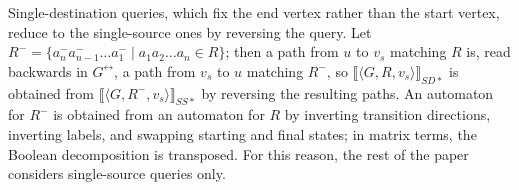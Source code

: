 %	
%	
%	

Single-destination queries, which fix the end vertex rather than the start vertex, reduce to the single-source ones by reversing the query.
Let $R^- = \{ a_n^- a_{n-1}^- \ldots a_1^- \mid a_1 a_2 \ldots a_n \in R \}$; then a path from $u$ to $v_s$ matching $R$ is, read backwards in $G^\leftrightarrow$, a path from $v_s$ to $u$ matching $R^-$, so $\llbracket \langle G, R, v_s \rangle \rrbracket_{SD*}$ is obtained from $\llbracket \langle G, R^-, v_s \rangle \rrbracket_{SS*}$ by reversing the resulting paths.
An automaton for $R^-$ is obtained from an automaton for $R$ by inverting transition directions, inverting labels, and swapping starting and final states; in matrix terms, the Boolean decomposition is transposed.
For this reason, the rest of the paper considers single-source queries only.

